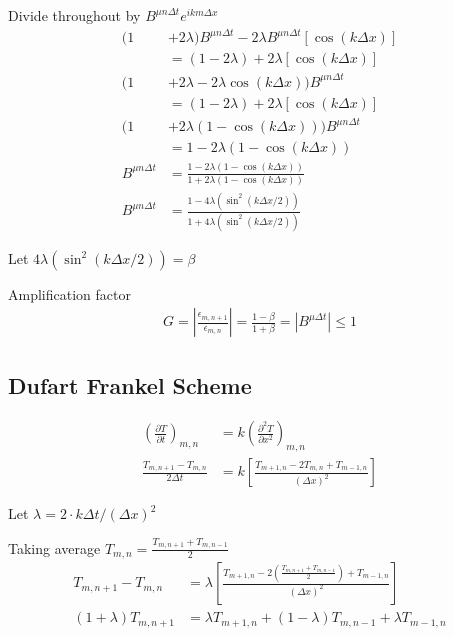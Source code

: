 \documentclass[fleqn,10pt]{SelfArx} %
\begin{document}
Divide throughout by $B^{\mu n \Delta t} e^{ikm\Delta x}$
\begin{align*}
	(1 &+ 2\lambda)B^{\mu n\Delta t} - 2\lambda B^{\mu n \Delta t}\left[\cos(k \Delta x)\right] \\ &= (1 - 2\lambda) + 2\lambda \left[\cos(k \Delta x)\right] \\
	(1 &+ 2\lambda - 2\lambda \cos(k \Delta x))B^{\mu n\Delta t} \\ &= (1 - 2\lambda) + 2\lambda \left[\cos(k \Delta x)\right] \\
	(1 &+ 2\lambda(1 - \cos(k \Delta x)))B^{\mu n\Delta t} \\ &= 1 - 2\lambda(1 - \cos(k \Delta x)) \\
	B^{\mu n\Delta t} &= \frac{1 - 2\lambda(1 - \cos(k \Delta x))}{1 + 2\lambda(1 - \cos(k \Delta x))} \\
	B^{\mu n\Delta t} &= \frac{1 - 4\lambda(\sin^2(k \Delta x/2))}{1 + 4\lambda(\sin^2(k \Delta x/2))} \tag{13.7} \label{eq:13.7}
\end{align*}

Let $4\lambda(\sin^2(k \Delta x/2)) = \beta$

Amplification factor
\begin{align*}
	G = \left|\frac{\epsilon_{m,n+1}}{\epsilon_{m,n}}\right| = \frac{1-\beta}{1+ \beta} = \left|B^{\mu \Delta t}\right| \leq 1 \tag{13.8} \label{eq:13.8}
\end{align*}

\subsection{Dufart Frankel Scheme}
\begin{align*}
	\left(\frac{\partial T}{\partial t}\right)_{m,n} &= k\left(\frac{\partial^2 T}{\partial x^2}\right)_{m,n} \tag{13.9} \label{eq:13.9} \\
	\frac{T_{m,n+1} - T_{m,n}}{2\Delta t} &= k\left[\frac{T_{m+1,n} - 2T_{m,n} + T_{m-1,n}}{(\Delta x)^2}\right] \tag{13.10} \label{eq:13.10}
\end{align*}

Let $\lambda = 2 \cdot k\Delta t/(\Delta x)^2$

Taking average $T_{m,n} = \frac{T_{m,n+1} + T_{m,n-1}}{2}$
\begin{align*}
	T_{m,n+1} - T_{m,n} &= \lambda\left[\frac{T_{m+1,n} - 2\left(\frac{T_{m,n+1} + T_{m,n-1}}{2}\right) + T_{m-1,n}}{(\Delta x)^2}\right] \\
	(1+\lambda)T_{m,n+1} &= \lambda T_{m+1,n} + (1 - \lambda)T_{m,n-1} + \lambda T_{m-1,n} \tag{13.11} \label{eq:13.11}
\end{align*}
\end{document}
